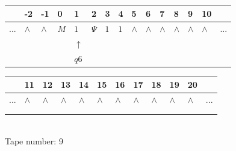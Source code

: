 \documentclass[11pt]{article}
\begin{document}
\begin{table}[H]
\centering
\begin{tabular}{lllllllllllllll}
 & -2 & -1 & 0 & 1 & 2 & 3 & 4 & 5 & 6 & 7 & 8 & 9 & 10 & \\
\hline
$...$ & \multicolumn{1}{|l|}{$\wedge$} & \multicolumn{1}{|l|}{$\wedge$} & \multicolumn{1}{|l|}{$M$} & \multicolumn{1}{|l|}{$1$} & \multicolumn{1}{|l|}{$\Psi$} & \multicolumn{1}{|l|}{$1$} & \multicolumn{1}{|l|}{$1$} & \multicolumn{1}{|l|}{$\wedge$} & \multicolumn{1}{|l|}{$\wedge$} & \multicolumn{1}{|l|}{$\wedge$} & \multicolumn{1}{|l|}{$\wedge$} & \multicolumn{1}{|l|}{$\wedge$} & \multicolumn{1}{|l|}{$\wedge$} & $...$\\
\hline
&  &  &  & $\uparrow$ &  &  &  &  &  &  &  &  &  &  \\
&  &  &  & $ q6 $ &  &  &  &  &  &  &  &  &  &  \\
\end{tabular}
\begin{tabular}{llllllllllll}
 & 11 & 12 & 13 & 14 & 15 & 16 & 17 & 18 & 19 & 20 & \\
\hline
$...$ & \multicolumn{1}{|l|}{$\wedge$} & \multicolumn{1}{|l|}{$\wedge$} & \multicolumn{1}{|l|}{$\wedge$} & \multicolumn{1}{|l|}{$\wedge$} & \multicolumn{1}{|l|}{$\wedge$} & \multicolumn{1}{|l|}{$\wedge$} & \multicolumn{1}{|l|}{$\wedge$} & \multicolumn{1}{|l|}{$\wedge$} & \multicolumn{1}{|l|}{$\wedge$} & \multicolumn{1}{|l|}{$\wedge$} & $...$\\
\hline
&  &  &  &  &  &  &  &  &  &  &  \\
&  &  &  &  &  &  &  &  &  &  &  \\
\end{tabular}
\\
Tape number: 9
\noindent\makebox[\linewidth]{\hdashrule{\textwidth}{1pt}{1pt}}\end{table}
\end{document}
